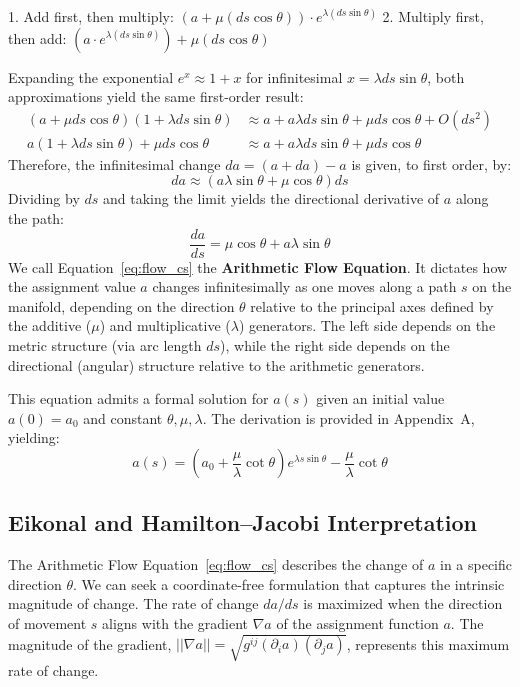 \documentclass[12pt]{article}
\begin{document}
1.  Add first, then multiply: \( (a + \mu (ds \cos \theta)) \cdot e^{\lambda (ds \sin \theta)} \)
2.  Multiply first, then add: \( (a \cdot e^{\lambda (ds \sin \theta)}) + \mu (ds \cos \theta) \)

Expanding the exponential \( e^x \approx 1 + x \) for infinitesimal \( x = \lambda ds \sin \theta \), both approximations yield the same first-order result:
\begin{align*}
(a + \mu ds \cos \theta)(1 + \lambda ds \sin \theta) &\approx a + a \lambda ds \sin \theta + \mu ds \cos \theta + O(ds^2) \\
a (1 + \lambda ds \sin \theta) + \mu ds \cos \theta &\approx a + a \lambda ds \sin \theta + \mu ds \cos \theta
\end{align*}
Therefore, the infinitesimal change \( da = (a+da) - a \) is given, to first order, by:
\[
da \approx (a \lambda \sin \theta + \mu \cos \theta) ds
\]
Dividing by \( ds \) and taking the limit yields the directional derivative of \( a \) along the path:
\begin{equation}
    \frac{da}{ds} = \mu \cos \theta + a \lambda \sin \theta \label{eq:flow_cs}
\end{equation}
We call Equation~\eqref{eq:flow_cs} the \textbf{Arithmetic Flow Equation}. It dictates how the assignment value \( a \) changes infinitesimally as one moves along a path \( s \) on the manifold, depending on the direction \( \theta \) relative to the principal axes defined by the additive (\(\mu\)) and multiplicative (\(\lambda\)) generators. The left side depends on the metric structure (via arc length \( ds \)), while the right side depends on the directional (angular) structure relative to the arithmetic generators.

This equation admits a formal solution for \( a(s) \) given an initial value \( a(0)=a_0 \) and constant \( \theta, \mu, \lambda \). The derivation is provided in Appendix~A, yielding: %
\begin{equation}
   a(s) = (a_0 + \frac{\mu}{\lambda} \cot \theta) e^{\lambda s \sin \theta} - \frac{\mu}{\lambda} \cot \theta \label{eq:solution_cs}
\end{equation}

\subsection{Eikonal and Hamilton–Jacobi Interpretation} %

The Arithmetic Flow Equation~\eqref{eq:flow_cs} describes the change of \( a \) in a specific direction \( \theta \). We can seek a coordinate-free formulation that captures the intrinsic magnitude of change. The rate of change \( da/ds \) is maximized when the direction of movement \( s \) aligns with the gradient \( \nabla a \) of the assignment function \( a \). The magnitude of the gradient, \( ||\nabla a|| = \sqrt{g^{ij} (\partial_i a) (\partial_j a)} \), represents this maximum rate of change.
\end{document}

